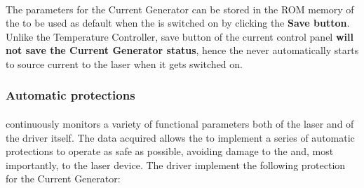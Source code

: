 \paragraph{} The parameters for the Current Generator can be stored in the ROM memory of the \QubeModel  to be used as default when the \QubeModel  is switched on by clicking the \textbf{Save button}. Unlike the Temperature Controller, save button of the current control panel \textbf{will not save the Current Generator status}, hence the \QubeModel  never automatically starts to source current to the laser when it gets switched on.





\subsubsection{Automatic protections} \label{Automatic_protection_chapter}
\paragraph{} \QubeModel  continuously monitors a variety of functional parameters both of the laser and of the \QubeModel  driver itself. The data acquired allows the \QubeModel  to implement a series of automatic protections to operate as safe as possible, avoiding damage to the \QubeModel  and, most importantly, to the laser device. 
\newline The \QubeModel  driver implement the following protection for the Current Generator:

